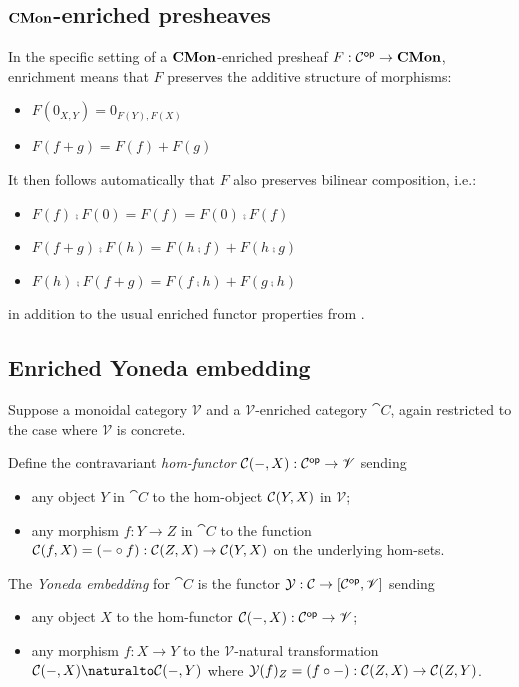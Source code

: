 \subsection{$\mathbf{CMon}$-enriched presheaves}

In the specific setting of a $\mathbf{CMon}$-enriched presheaf $F: \mathcal{C}^{\mathsf{op}} \to \mathbf{CMon}$, enrichment means that $F$
preserves the additive structure of morphisms:
\begin{itemize}
\item $F(0_{X,Y}) = 0_{F(Y),F(X)}$
\item $F(f + g) = F(f) + F(g)$
\end{itemize}
It then follows automatically that $F$ also preserves bilinear composition, i.e.:
\begin{itemize}
\item $F(f) \comp F(0) = F(f) = F(0) \comp F(f)$
\item $F(f + g) \comp F(h) = F(h \comp f) + F(h \comp g)$
\item $F(h) \comp F(f + g) = F(f \comp h) + F(g \comp h)$
\end{itemize}
in addition to the usual enriched functor properties from .

\subsection{Enriched Yoneda embedding}

Suppose a monoidal category $\mathscr{V}$ and a $\mathscr{V}$-enriched category $\cat{C}$, again restricted to
the case where $\mathscr{V}$ is concrete.

\begin{definition}
Define the contravariant \emph{hom-functor} ${\mathcal{C}}(-,X): \mathcal{C}^{\mathsf{op}} \to \mathscr{V}$ sending
\begin{itemize}
\item any object $Y$ in $\cat{C}$ to the hom-object ${\mathcal{C}}(Y,X)$ in $\mathscr{V}$;
\item any morphism $f: Y \to Z$ in $\cat{C}$ to the function ${\mathcal{C}}(f,X) = (- \circ f):
{\mathcal{C}}(Z,X) \to {\mathcal{C}}(Y,X)$ on the underlying hom-sets.
\end{itemize}
\end{definition}

\begin{definition}
The \emph{Yoneda embedding} for $\cat{C}$ is the functor $\mathcal{Y}: \mathcal{C} \to
[\mathcal{C}^{\mathsf{op}},\mathscr{V}]$ sending
\begin{itemize}
\item any object $X$ to the hom-functor ${\mathcal{C}}(-,X): \mathcal{C}^{\mathsf{op}} \to \mathscr{V}$;
\item any morphism $f: X \to Y$ to the $\mathscr{V}$-natural transformation $\Hom{\cat{C}}{-}{X} \naturalto
\Hom{\cat{C}}{-}{Y}$ where $\mathcal{Y}(f)_Z = (f \circ -): {\mathcal{C}}(Z,X) \to {\mathcal{C}}(Z,Y)$.
\end{itemize}
\end{definition}

